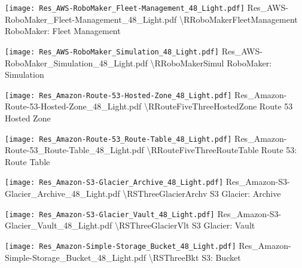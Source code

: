 {\texttt{[image: Res\_AWS-RoboMaker\_Fleet-Management\_48\_Light.pdf]}} {Res\_AWS-RoboMaker\_Fleet-Management\_48\_Light.pdf} {{\textbackslash}RRoboMakerFleetManagement} {RoboMaker: Fleet Management}

 {\texttt{[image: Res\_AWS-RoboMaker\_Simulation\_48\_Light.pdf]}} {Res\_AWS-RoboMaker\_Simulation\_48\_Light.pdf} {{\textbackslash}RRoboMakerSimul} {RoboMaker: Simulation}

 {\texttt{[image: Res\_Amazon-Route-53-Hosted-Zone\_48\_Light.pdf]}} {Res\_Amazon-Route-53-Hosted-Zone\_48\_Light.pdf} {{\textbackslash}RRouteFiveThreeHostedZone} {Route 53 Hosted Zone}

 {\texttt{[image: Res\_Amazon-Route-53\_Route-Table\_48\_Light.pdf]}} {Res\_Amazon-Route-53\_Route-Table\_48\_Light.pdf} {{\textbackslash}RRouteFiveThreeRouteTable} {Route 53: Route Table}

 {\texttt{[image: Res\_Amazon-S3-Glacier\_Archive\_48\_Light.pdf]}} {Res\_Amazon-S3-Glacier\_Archive\_48\_Light.pdf} {{\textbackslash}RSThreeGlacierArchv} {S3 Glacier: Archive}

 {\texttt{[image: Res\_Amazon-S3-Glacier\_Vault\_48\_Light.pdf]}} {Res\_Amazon-S3-Glacier\_Vault\_48\_Light.pdf} {{\textbackslash}RSThreeGlacierVlt} {S3 Glacier: Vault}

 {\texttt{[image: Res\_Amazon-Simple-Storage\_Bucket\_48\_Light.pdf]}} {Res\_Amazon-Simple-Storage\_Bucket\_48\_Light.pdf} {{\textbackslash}RSThreeBkt} {S3: Bucket}

